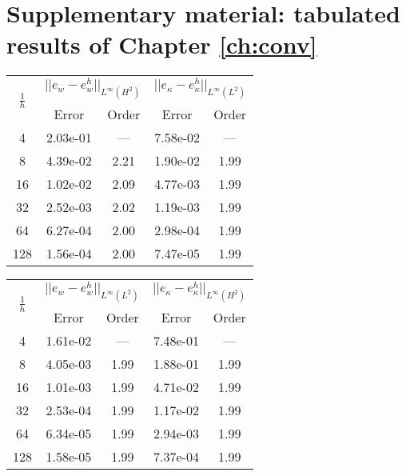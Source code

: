 \chapter{Supplementary material: tabulated results of Chapter \ref{ch:conv}}

\begin{table}[hp]
	\centering
	\begin{tabular}{ccccc}
		\hline 
		\multirow{2}{*}{$\frac{1}{h}$} & \multicolumn{2}{c}{$||e_w - e_w^h||_{L^{\infty}(H^2)}$}  & \multicolumn{2}{c}{$||e_\kappa - e_\kappa^h||_{L^{\infty}(L^2)}$}   \\ 
		& Error & Order  & Error & Order  \\
		\hline 
		4  & 2.03e-01 & ---  & 7.58e-02 & ---  \\ 
		8  & 4.39e-02 & 2.21 & 1.90e-02 & 1.99 \\ 
		16 & 1.02e-02 & 2.09 & 4.77e-03 & 1.99 \\ 
		32 & 2.52e-03 & 2.02 & 1.19e-03 & 1.99 \\ 
		64 & 6.27e-04 & 2.00 & 2.98e-04 & 1.99 \\ 
		128& 1.56e-04 & 2.00 & 7.47e-05 & 1.99 \\
		\hline 
	\end{tabular} 
	\captionsetup{width=0.95\linewidth}
	\vspace{1mm}
	\label{tab:resebHerDG1}
\end{table}	


\begin{table}[hp]
	\centering
	\begin{tabular}{ccccc}
		\hline 
		\multirow{2}{*}{$\frac{1}{h}$} & \multicolumn{2}{c}{$||e_w - e_w^h||_{L^{\infty}(L^2)}$}  & \multicolumn{2}{c}{$||e_\kappa - e_\kappa^h||_{L^{\infty}(H^2)}$}   \\ 
		& Error & Order  & Error & Order  \\
		\hline 
		4  & 1.61e-02 & ---  & 7.48e-01 & ---  \\ 
		8  & 4.05e-03 & 1.99 & 1.88e-01 & 1.99 \\ 
		16 & 1.01e-03 & 1.99 & 4.71e-02 & 1.99 \\ 
		32 & 2.53e-04 & 1.99 & 1.17e-02 & 1.99 \\ 
		64 & 6.34e-05 & 1.99 & 2.94e-03 & 1.99 \\ 
		128& 1.58e-05 & 1.99 & 7.37e-04 & 1.99 \\
		\hline 
	\end{tabular} 
	\captionsetup{width=0.95\linewidth}
	\vspace{1mm}
	\label{tab:resebDG1Her}
\end{table}	


